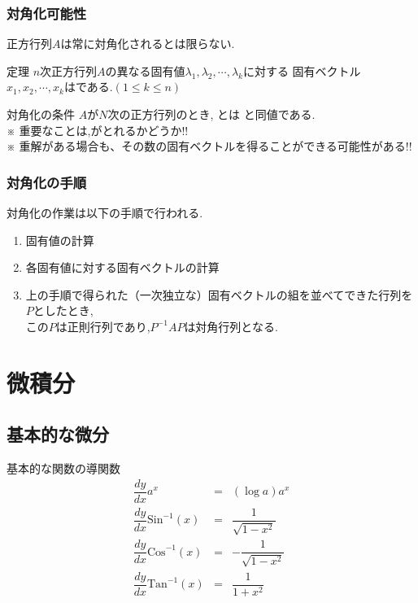 \documentclass[a4paper]{jsarticle}
\begin{document}
\subsubsection{対角化可能性}
正方行列$A$は常に対角化されるとは限らない.
\begin{itembox}[l]{定理}
    $n$次正方行列$A$の異なる固有値$\lambda_1,\lambda_2,\cdots,\lambda_k$に対する
    固有ベクトル$x_1,x_2,\cdots,x_k$はである.$\left(1\leq k\leq n\right)$
\end{itembox}
\begin{itembox}[l]{対角化の条件}
    $A$が$N$次の正方行列のとき, とは
    と同値である.\\
    ※ 重要なことは,がとれるかどうか!!\\
    ※ 重解がある場合も、その数の固有ベクトルを得ることができる可能性がある!!
\end{itembox}
\subsubsection{対角化の手順}
対角化の作業は以下の手順で行われる.
\begin{enumerate}[(1)]
    \item 固有値の計算
    \item 各固有値に対する固有ベクトルの計算
    \item 上の手順で得られた（一次独立な）固有ベクトルの組を並べてできた行列を$P$としたとき,\\
          この$P$は正則行列であり,$P^{-1}AP$は対角行列となる.
\end{enumerate}
\newpage
\section{微積分}
\subsection{基本的な微分}
\begin{itembox}[l]{基本的な関数の導関数}
    \begin{eqnarray*}
        \dfrac{dy}{dx}a^x&=&\left(\log a\right)a^x\\
        \dfrac{dy}{dx}\mathrm{Sin}^{-1}\left(x\right)&=&\dfrac{1}{\sqrt{1-x^2}}\\
        \dfrac{dy}{dx}\mathrm{Cos}^{-1}\left(x\right)&=&-\dfrac{1}{\sqrt{1-x^2}}\\
        \dfrac{dy}{dx}\mathrm{Tan}^{-1}\left(x\right)&=&\dfrac{1}{1+x^2}
    \end{eqnarray*}
\end{itembox}
\end{document}
